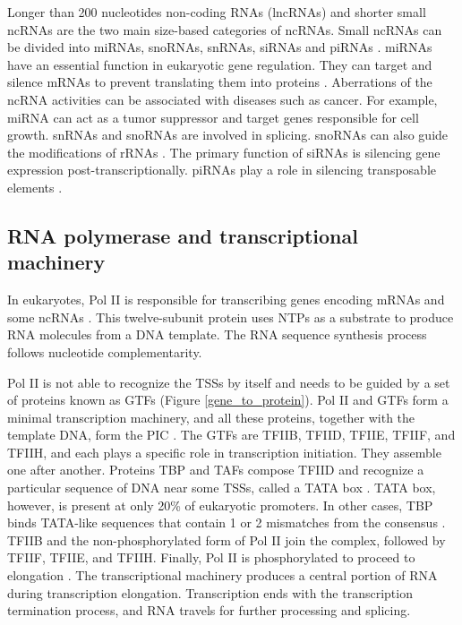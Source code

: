     Longer than 200 nucleotides non-coding RNAs (\ac{lncRNAs}) and shorter small ncRNAs are the two main size-based categories of ncRNAs. Small ncRNAs can be divided into \ac{miRNAs}, \ac{snoRNAs}, \ac{snRNAs}, \ac{siRNAs} and \ac{piRNAs} \cite{xiao2022disorders}. miRNAs have an essential function in eukaryotic gene regulation. They can target and silence mRNAs to prevent translating them into proteins \cite{mrna}. Aberrations of the ncRNA activities can be associated with diseases such as cancer. For example, miRNA can act as a tumor suppressor and target genes responsible for cell growth. snRNAs and snoRNAs are involved in splicing. snoRNAs can also guide the modifications of rRNAs \cite{xiao2022disorders}. The primary function of siRNAs is silencing gene expression post-transcriptionally. piRNAs play a role in silencing transposable elements \cite{kaikkonen2011non}.

    \subsection{RNA polymerase and transcriptional machinery}

    In eukaryotes, \ac{Pol II} is responsible for transcribing genes encoding mRNAs and some ncRNAs \cite{nikolov1997rna}. This twelve-subunit protein uses NTPs as a substrate to produce RNA molecules from a DNA template. The RNA sequence synthesis process follows nucleotide complementarity.

    Pol II is not able to recognize the \ac{TSSs} by itself and needs to be guided by a set of proteins known as \ac{GTFs} ({Figure \ref{gene_to_protein}}). Pol II and GTFs form a minimal transcription machinery, and all these proteins, together with the template DNA, form the \ac{PIC} \cite{liu2013rna,nikolov1997rna}. The GTFs are TFIIB, TFIID, TFIIE, TFIIF, and TFIIH, and each plays a specific role in transcription initiation. They assemble one after another. Proteins \ac{TBP} and \ac{TAFs} compose TFIID and recognize a particular sequence of DNA near some TSSs, called a TATA box \cite{donczew2018mechanistic}. TATA box, however, is present at only 20\% of eukaryotic promoters. In other cases, TBP binds TATA-like sequences that contain 1 or 2 mismatches from the consensus \cite{donczew2018mechanistic}. TFIIB and the non-phosphorylated form of Pol II join the complex, followed by TFIIF, TFIIE, and TFIIH. Finally, Pol II is phosphorylated to proceed to elongation \cite{nikolov1997rna}. The transcriptional machinery produces a central portion of RNA during transcription elongation. Transcription ends with the transcription termination process, and RNA travels for further processing and splicing.

